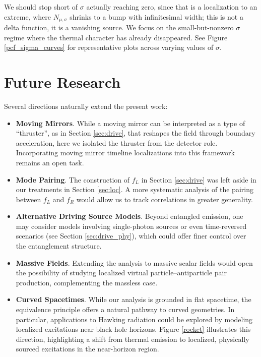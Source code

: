 \documentclass[12pt,a4paper]{article}
\begin{document}
{We should stop short of $\sigma$ actually reaching zero, since that is a localization to an extreme, where $N_{\mu,\sigma}$ shrinks to a bump with infinitesimal width; this is not a delta function, it is a vanishing source. We focus on the small-but-nonzero $\sigma$ regime where the thermal character has already disappeared. See Figure \ref{pcf_sigma_curves} for representative plots across varying values of $\sigma$.

\section{Future Research} \label{sec:future}

Several directions naturally extend the present work:
\begin{itemize}
\item {\bf Moving Mirrors}. While a moving mirror can be interpreted as a type of ``thruster'', as in Section \ref{sec:drive}, that reshapes the field through boundary acceleration, here we isolated the thruster from the detector role. Incorporating moving mirror timeline localizations into this framework remains an open task.

\item {\bf Mode Pairing}. The construction of $f_L$ in Section \ref{sec:drive} was left aside in our treatments in Section \ref{sec:loc}. A more systematic analysis of the pairing between $f_L$ and $f_R$ would allow us to track correlations in greater generality.

\item {\bf Alternative Driving Source Models}. Beyond entangled emission, one may consider models involving single-photon sources or even time-reversed scenarios (see Section \ref{sec:drive_phy}), which could offer finer control over the entanglement structure.

\item {\bf Massive Fields}. Extending the analysis to massive scalar fields would open the possibility of studying localized virtual particle–antiparticle pair production, complementing the massless case.

\item {\bf Curved Spacetimes}. While our analysis is grounded in flat spacetime, the equivalence principle offers a natural pathway to curved geometries. In particular, applications to Hawking radiation could be explored by modeling localized excitations near black hole horizons. Figure \ref{rocket} illustrates this direction, highlighting a shift from thermal emission to localized, physically sourced excitations in the near-horizon region.


\end{itemize}}
\end{document}

